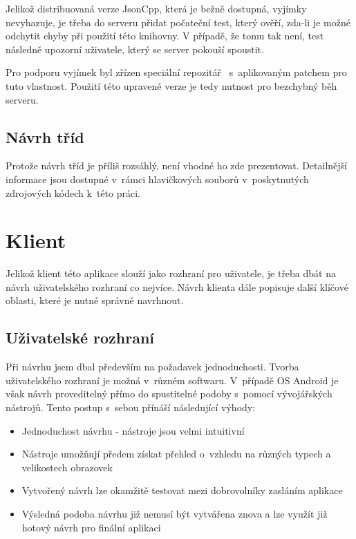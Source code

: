 \documentclass[thesis=B,czech]{FITthesis}[2013/10/20]
\begin{document}
Jelikož distribuovaná verze JsonCpp, která je bežně dostupná, vyjímky nevyhazuje, je třeba do serveru přidat počateční test, který ověří, zda-li je možné odchytit chyby při použití této knihovny. V případě, že tomu tak není, test následně upozorní uživatele, který se server pokouší spoustit.

Pro podporu vyjímek byl zřízen speciální repozitář~\cite{json_ex_repo} s~aplikovaným patchem pro tuto vlastnost. Použití této upravené verze je tedy nutnost pro bezchybný běh serveru.

\subsection{Návrh tříd}

Protože návrh tříd je příliš rozsáhlý, není vhodné ho zde prezentovat. Detailnější informace jsou dostupné v~rámci hlavičkových souborů v~poskytnutých zdrojových kódech k~této práci.

\section{Klient}

Jelikož klient této aplikace slouží jako rozhraní pro uživatele, je třeba dbát na návrh uživatelského rozhraní co nejvíce. Návrh klienta dále popisuje další klíčové oblasti, které je nutné správně navrhnout.

\subsection{Uživatelské rozhraní}

Při návrhu jsem dbal především na požadavek jednoduchosti. Tvorba uživatelského rozhraní je možná v~různém softwaru. V~případě OS Android je však návrh proveditelný přímo do spustitelné podoby s~pomocí vývojářských nástrojů. Tento postup s~sebou přínáší následující výhody:

\begin{itemize}
  \item{Jednoduchost návrhu - nástroje jsou velmi intuitivní}
  \item{Nástroje umožňují předem získat přehled o~vzhledu na různých typech a velikostech obrazovek}
  \item{Vytvořený návrh lze okamžitě testovat mezi dobrovolníky zasláním aplikace}
  \item{Výsledná podoba návrhu již nemusí být vytvářena znova a lze využít již hotový návrh pro finální aplikaci}
\end{itemize}
\end{document}
